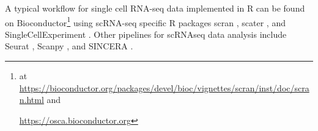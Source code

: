 
A typical workflow for single cell RNA-seq data implemented in R can be found on Bioconductor\footnote{at \url{https://bioconductor.org/packages/devel/bioc/vignettes/scran/inst/doc/scran.html} and

\url{https://osca.bioconductor.org}} using scRNA-seq specific R packages scran \cite{lun2016step, risso2016scrnaseq}, scater \cite{mccarthy2017scater}, and SingleCellExperiment 
\cite{lun2019singlecellexperiment}.
Other pipelines for scRNAseq data analysis include 
Seurat \cite{butler2018integrating},
Scanpy \cite{wolf2018scanpy}, 
and SINCERA \cite{guo2015sincera}. 











